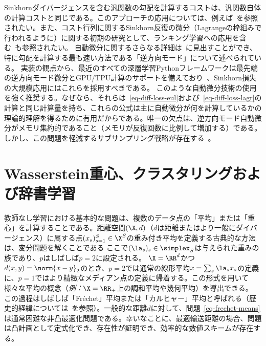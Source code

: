 Sinkhornダイバージェンスを含む汎関数の勾配を計算するコストは、汎関数自体の計算コストと同じである。このアプローチの応用については、例えば~\citep{2016-bonneel-barycoord,2017-Genevay-AutoDiff}を参照されたい。また、コスト行列に関するSinkhorn反復の微分（Lagrangeの枠組みで行われるように）に関する初期の研究として、ランキング学習への応用を含む~\citep{adams2011ranking}も参照されたい。
%
自動微分に関するさらなる詳細は~\citep{griewank2008evaluating,rall1981automatic,Neidinger10}に見出すことができ、特に勾配を計算する最も速い方法である「逆方向モード」について述べられている。
%
実装の観点から、最近のすべての深層学習Pythonフレームワークは最先端の逆方向モード微分とGPU/TPU計算のサポートを備えており~\citep{theano2016,abadi2016tensorflow,pytorch}、Sinkhorn損失の大規模応用にはこれらを採用すべきである。
%
このような自動微分技術の使用を強く推奨する。なぜなら、それらは~\eqref{eq-diff-loss-eul}および~\eqref{eq-diff-loss-lagr}の計算と同じ計算量を持ち、これらの公式は主に自動微分が何を計算しているかの理論的理解を得るために有用だからである。唯一の欠点は、逆方向モード自動微分がメモリ集約的であること（メモリが反復回数に比例して増加する）である。しかし、この問題を軽減するサブサンプリング戦略が存在する~\citep{griewank1992achieving}。





\section{Wasserstein重心、クラスタリングおよび辞書学習}
\label{sec-bary}

教師なし学習における基本的な問題は、複数のデータ点の「平均」または「重心」を計算することである。距離空間$(\X,d)$（$d$は距離またはより一般にダイバージェンス）に属する点$(x_s)_{s=1}^S \in \X^S$の重み付き平均を定義する古典的な方法は、変分問題を解くことである
ここで$(\la_s)_s \in \simplex_S$は与えられた重みの族であり、$p$はしばしば$p=2$に設定される。
%
$\X=\RR^d$かつ$d(x,y)=\norm{x-y}_2$のとき、$p=2$では通常の線形平均$x=\sum_s \la_s x_s$の定義に、$p=1$ではより精緻なメディアン点の定義に帰着する。この形式を用いて様々な平均の概念（\emph{例：}$\X=\RR_+$上の調和平均や幾何平均）を導出できる。
%
この過程はしばしば「Fréchet」平均または「カルヒャー」平均と呼ばれる（歴史的経緯については~\citet{karcher2014riemannian}を参照）。一般的な距離$d$に対して、問題~\eqref{eq-frechet-means}は通常困難な非凸最適化問題である。幸いなことに、最適輸送距離の場合、問題は凸計画として定式化でき、存在性が証明でき、効率的な数値スキームが存在する。


